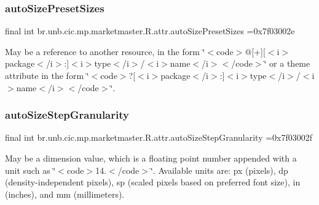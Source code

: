 \subsubsection{\texorpdfstring{auto\+Size\+Preset\+Sizes}{autoSizePresetSizes}}
{\footnotesize\ttfamily final int br.\+unb.\+cic.\+mp.\+marketmaster.\+R.\+attr.\+auto\+Size\+Preset\+Sizes =0x7f03002e\hspace{0.3cm}{\ttfamily [static]}}

May be a reference to another resource, in the form \char`\"{}$<$code$>$@\mbox{[}+\mbox{]}\mbox{[}$<$i$>$package$<$/i$>$\+:\mbox{]}$<$i$>$type$<$/i$>$/$<$i$>$name$<$/i$>$$<$/code$>$\char`\"{} or a theme attribute in the form \char`\"{}$<$code$>$?\mbox{[}$<$i$>$package$<$/i$>$\+:\mbox{]}$<$i$>$type$<$/i$>$/$<$i$>$name$<$/i$>$$<$/code$>$\char`\"{}. \mbox{\label{classbr_1_1unb_1_1cic_1_1mp_1_1marketmaster_1_1R_1_1attr_a4740faa51a63e3ec68bb9196b68be379}} 
\subsubsection{\texorpdfstring{auto\+Size\+Step\+Granularity}{autoSizeStepGranularity}}
{\footnotesize\ttfamily final int br.\+unb.\+cic.\+mp.\+marketmaster.\+R.\+attr.\+auto\+Size\+Step\+Granularity =0x7f03002f\hspace{0.3cm}{\ttfamily [static]}}

May be a dimension value, which is a floating point number appended with a unit such as \char`\"{}$<$code$>$14.\+5sp$<$/code$>$\char`\"{}. Available units are\+: px (pixels), dp (density-\/independent pixels), sp (scaled pixels based on preferred font size), in (inches), and mm (millimeters). \mbox{\label{classbr_1_1unb_1_1cic_1_1mp_1_1marketmaster_1_1R_1_1attr_ad5b5b91e7cc84ce8f5057578878f2c02}} 
